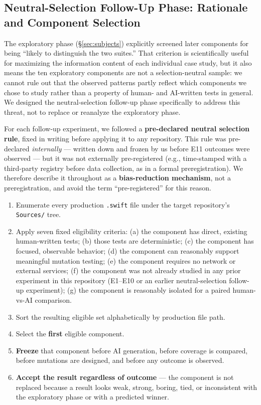 \documentclass[10pt,conference]{IEEEtran}
\begin{document}
\subsection{Neutral-Selection Follow-Up Phase: Rationale and Component Selection}
\label{sec:confselection}
The exploratory phase (\S\ref{sec:subjects}) explicitly screened later components for being ``likely to distinguish the two suites.'' That criterion is scientifically useful for maximizing the information content of each individual case study, but it also means the ten exploratory components are not a selection-neutral sample: we cannot rule out that the observed patterns partly reflect which components we chose to study rather than a property of human- and AI-written tests in general. We designed the neutral-selection follow-up phase specifically to address this threat, not to replace or reanalyze the exploratory phase.

For each follow-up experiment, we followed a \textbf{pre-declared neutral selection rule}, fixed in writing before applying it to any repository. This rule was pre-declared \emph{internally} — written down and frozen by us before E11 outcomes were observed — but it was not externally pre-registered (e.g., time-stamped with a third-party registry before data collection, as in a formal preregistration). We therefore describe it throughout as a \textbf{bias-reduction mechanism}, not a preregistration, and avoid the term ``pre-registered'' for this reason.
\begin{enumerate}
\item Enumerate every production \texttt{.swift} file under the target repository's \texttt{Sources/} tree.
\item Apply seven fixed eligibility criteria: (a) the component has direct, existing human-written tests; (b) those tests are deterministic; (c) the component has focused, observable behavior; (d) the component can reasonably support meaningful mutation testing; (e) the component requires no network or external services; (f) the component was not already studied in any prior experiment in this repository (E1--E10 or an earlier neutral-selection follow-up experiment); (g) the component is reasonably isolated for a paired human-vs-AI comparison.
\item Sort the resulting eligible set alphabetically by production file path.
\item Select the \textbf{first} eligible component.
\item \textbf{Freeze} that component before AI generation, before coverage is compared, before mutations are designed, and before any outcome is observed.
\item \textbf{Accept the result regardless of outcome} — the component is not replaced because a result looks weak, strong, boring, tied, or inconsistent with the exploratory phase or with a predicted winner.
\end{enumerate}
\end{document}
